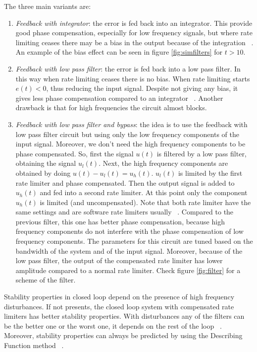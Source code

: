 The three main variants are:
\begin{enumerate}
\item \emph{Feedback with integrator}: the error is fed back into an integrator. This provide good phase compensation, especially for low frequency signals, but where rate limiting ceases there may be a bias in the output because of the integration ~\cite[p. 3945]{paper3}. An example of the bias effect can be seen in figure \ref{fig:simfilters} for $t>10$.
\item \emph{Feedback with low pass filter}: the error is fed back into a low pass filter. In this way when rate limiting ceases there is no bias. When rate limiting starts $e(t) < 0$, thus reducing the input signal. Despite not giving any bias, it gives less phase compensation compared to an integrator ~\cite[p. 3945]{paper3}. Another drawback is that for high frequencies the circuit almost blocks.
\item \emph{Feedback with low pass filter and bypass}: the idea is to use the feedback with low pass filter circuit but using only the low frequency components of the input signal. Moreover,  we don't need the high frequency components to be phase compensated. So, first the signal $u(t)$ is filtered by a low pass filter, obtaining the signal $u_{l}(t)$. Next, the high frequency components are obtained by doing $u(t)-u_{l}(t)=u_{h}(t)$. $u_{l}(t)$ is limited by the first rate limiter and phase compensated. Then the output signal is added to $u_{h}(t)$ and fed into a second rate limiter. At this point only the component $u_{h}(t)$ is limited (and uncompensated). Note that both rate limiter have the same settings and are software rate limiters usually ~\cite[p. 3945]{paper3}. Compared to the previous filter, this one has better phase compensation, because high frequency components do not interfere with the phase compensation of low frequency components. The parameters for this circuit are tuned based on the bandwidth of the system and of the input signal. Moreover, because of the low pass filter, the output of the compensated rate limiter has lower amplitude compared to a normal rate limiter. Check figure \ref{fig:filter} for a scheme of the filter. 
\end{enumerate}	
Stability properties in closed loop depend on the presence of high frequency disturbances. If not presents, the closed loop system with compensated rate limiters  has better stability properties. With disturbances any of the filters can be the better one or the worst one, it depends on the rest of the loop ~\cite[p. 3946]{paper3}. Moreover, stability properties can always be predicted by using the Describing Function method ~\cite[p. 3946]{paper3}.